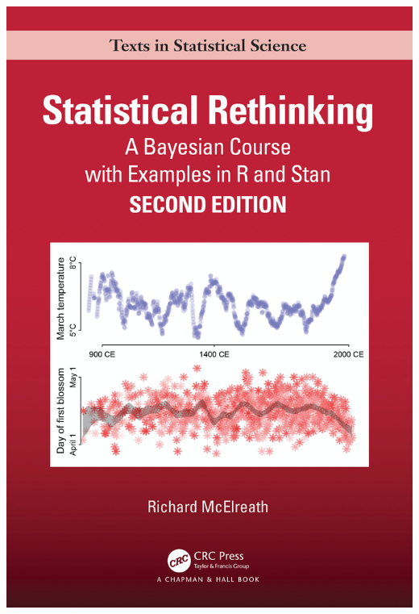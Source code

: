 \documentclass[
  ignorenonframetext,
  aspectratio=169]{beamer}
\begin{document}
\begin{frame}
\begin{center}\includegraphics[width=22.22in]{img/mcelreath} \end{center}
\end{frame}
\end{document}
